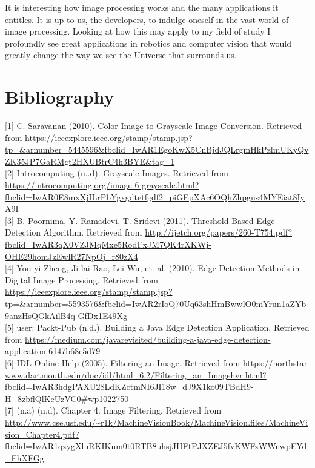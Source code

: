 \documentclass[a4paper,12pt]{article}
\begin{document}
	It is interesting how image processing works and the many applications it entitles. It is up to us, the developers, to indulge oneself in the vast world of image processing. Looking at how this may apply to my field of study I profoundly see great applications in robotics and computer vision that would greatly change the way we see the Universe that surrounds us.
		
	\section{Bibliography}
	
	
	[1] C. Saravanan (2010). Color  Image to Grayscale Image Conversion. Retrieved from \url{https://ieeexplore.ieee.org/stamp/stamp.jsp?tp=&arnumber=5445596&fbclid=IwAR1EgoKwX5CnBjdJQLrgmHkPzlmUKyQvZK35JP7GaRMgt2HXUBtrC4h3BYE&tag=1}\\
	
	[2] Introcomputing (n..d). Grayscale Images. Retrieved from \url{https://introcomputing.org/image-6-grayscale.html?fbclid=IwAR0E8mxXjILrPbYgxgdtetfgdf2_piGEpXAc6OQhZhpgus4MYEiat8IyA9I}\\
	
	[3] B. Poornima, Y. Ramadevi, T. Sridevi (2011). Threshold Based Edge Detection Algorithm. Retrieved from \url{http://ijetch.org/papers/260-T754.pdf?fbclid=IwAR3qX0VZJMqMxe5RodFxJM7QK4rXKWj-OHE29homJzEwlR27NpOj_r80zX4}\\
	
	[4] You-yi Zheng, Ji-lai Rao, Lei Wu, et. al. (2010). Edge Detection Methods in Digital Image Processing. Retrieved from \url{https://ieeexplore.ieee.org/stamp/stamp.jsp?tp=&arnumber=5593576&fbclid=IwAR2rIoQ70Uq63shHmBwwlO0mYrun1aZYb9anzHsQGkAilB4q-GfDx1E49Xg}\\
	
	[5] user: Packt-Pub (n.d.). Building a Java Edge Detection Application. Retrieved from \url{https://medium.com/javarevisited/building-a-java-edge-detection-application-6147b68e5d79}\\
		
	[6] IDL Online Help (2005). Filtering an Image. Retrieved from \url{https://northstar-www.dartmouth.edu/doc/idl/html_6.2/Filtering_an_Imagehvr.html?fbclid=IwAR3hdgPAXU28LdKZctmNI6JI18w_dJ9X1ko09TBdH9-H_8zbflQlKeUzVC0#wp1022750}\\
	
	[7] (n.a) (n.d). Chapter 4. Image Filtering. Retrieved from \url{http://www.cse.usf.edu/~r1k/MachineVisionBook/MachineVision.files/MachineVision_Chapter4.pdf?fbclid=IwAR1qzygXluRKIKnm0t0RTB8uhsjJHFtPJXZEJ5fvKWFzWWnwpEYd_FhXFGg}\\
	
\end{document}
